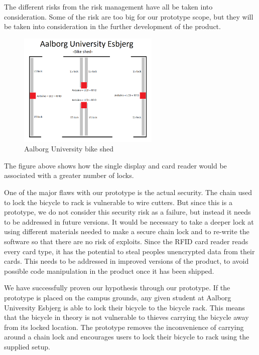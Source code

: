 \documentclass[twoside]{article}
\begin{document}
\begin{multicols}{2}
The different risks from the risk management have all be taken into consideration. Some of the risk are too big for our prototype scope, but they will be taken into consideration in the further development of the product.

\begin{figure}[H]
    \centering
    \includegraphics[width=0.6\textwidth]{./images/bikeshed.PNG}
    \caption{Aalborg University bike shed }
    \label{fig:bikeshed}
\end{figure}

The figure above shows how the single display and card reader would be associated with a greater number of locks.


One of the major flaws with our prototype is the actual security. The chain used to lock the bicycle to rack is vulnerable to wire cutters. But since this is a prototype, we do not consider this security risk as a failure, but instead it needs to be addressed in future versions. It would be necessary to take a deeper lock at using different materials needed to make a secure chain lock and to re-write the software so that there are no risk of exploits.
Since the RFID card reader reads every card type, it has the potential to steal peoples unencrypted data from their cards. This needs to be addressed in improved versions of the product, to avoid possible code manipulation in the product once it has been shipped.


We have successfully proven our hypothesis through our prototype. If the prototype is placed on the campus grounds, any given student at Aalborg University Esbjerg is able to lock their bicycle to the bicycle rack. This means that the bicycle in theory is not vulnerable to thieves carrying the bicycle away from its locked location. The prototype removes the inconvenience of carrying around a chain lock and encourages users to lock their bicycle to rack using the supplied setup.




\end{multicols}
\end{document}
